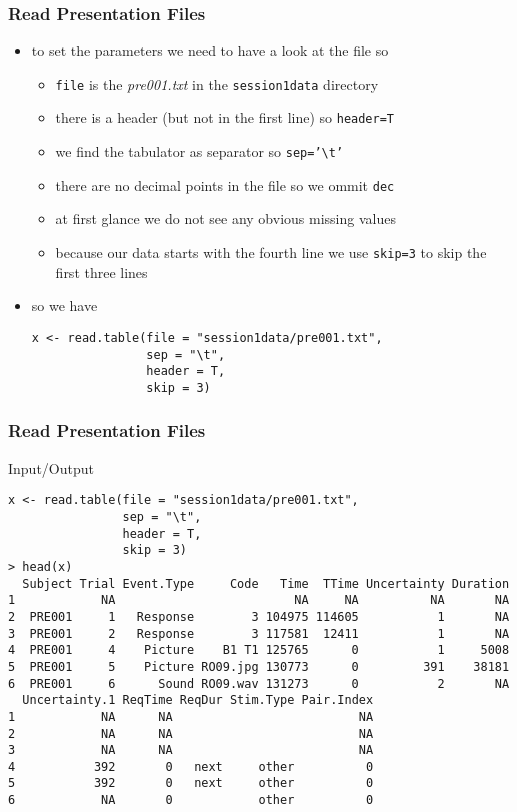 \documentclass[xcolor={table},c]{beamer}
\begin{document}
\begin{frame}[fragile]\frametitle{Read Presentation Files}
  \begin{itemize}
  \item to set the parameters we need to have a look at the file so 
    \begin{itemize}
    \item \texttt{file} is the \textit{pre001.txt} in the \texttt{session1data} directory
    \item there is a header (but not in the first line) so  \texttt{header=T}
    \item we find the tabulator as separator so \texttt{sep='\textbackslash{}t'} 
    \item there are no decimal points in the file so we ommit \texttt{dec} 
    \item at first glance we do not see any obvious missing values 
    \item because our data starts with the fourth line we use \texttt{skip=3} to skip the first three lines
    \end{itemize}
  \item so we have
\begin{verbatim}
x <- read.table(file = "session1data/pre001.txt",
                sep = "\t",
                header = T,
                skip = 3)
\end{verbatim}
  \end{itemize}
\end{frame}


\begin{frame}[fragile]\frametitle{Read Presentation Files}
\begin{exampleblock}{Input/Output}\scriptsize
\begin{verbatim}
x <- read.table(file = "session1data/pre001.txt",
                sep = "\t",
                header = T,
                skip = 3)
> head(x)
  Subject Trial Event.Type     Code   Time  TTime Uncertainty Duration
1            NA                         NA     NA          NA       NA
2  PRE001     1   Response        3 104975 114605           1       NA
3  PRE001     2   Response        3 117581  12411           1       NA
4  PRE001     4    Picture    B1 T1 125765      0           1     5008
5  PRE001     5    Picture RO09.jpg 130773      0         391    38181
6  PRE001     6      Sound RO09.wav 131273      0           2       NA
  Uncertainty.1 ReqTime ReqDur Stim.Type Pair.Index
1            NA      NA                          NA
2            NA      NA                          NA
3            NA      NA                          NA
4           392       0   next     other          0
5           392       0   next     other          0
6            NA       0            other          0
\end{verbatim}
\end{exampleblock}
\end{frame}
\end{document}
